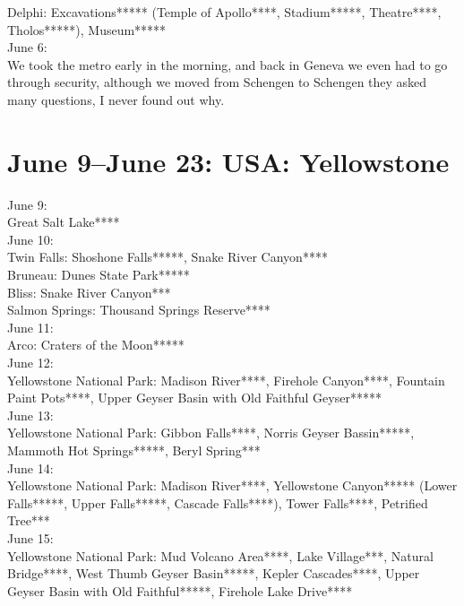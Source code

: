 Delphi: Excavations***** (Temple of Apollo****, Stadium*****, Theatre****, Tholos*****), Museum*****\\

June 6:\\
We took the metro early in the morning, and back in Geneva we even had to go through security, although we moved from Schengen to Schengen they asked many questions, I never found out why.

\section{June 9--June 23: USA: Yellowstone}
\label{US2017}

June 9:\\
Great Salt Lake****\\

June 10:\\
Twin Falls: Shoshone Falls*****, Snake River Canyon****\\
Bruneau: Dunes State Park*****\\
Bliss: Snake River Canyon***\\
Salmon Springs: Thousand Springs Reserve****\\

June 11:\\
Arco: Craters of the Moon*****\\

June 12:\\
Yellowstone National Park: Madison River****, Firehole Canyon****, Fountain Paint Pots****, Upper Geyser Basin with Old Faithful Geyser*****\\

June 13:\\
Yellowstone National Park: Gibbon Falls****, Norris Geyser Bassin*****, Mammoth Hot Springs*****, Beryl Spring***\\

June 14:\\
Yellowstone National Park: Madison River****, Yellowstone Canyon***** (Lower Falls*****, Upper Falls*****, Cascade Falls****), Tower Falls****, Petrified Tree***\\

June 15:\\
Yellowstone National Park: Mud Volcano Area****, Lake Village***, Natural Bridge****, West Thumb Geyser Basin*****, Kepler Cascades****, Upper Geyser Basin with Old Faithful*****, Firehole Lake Drive****\\

